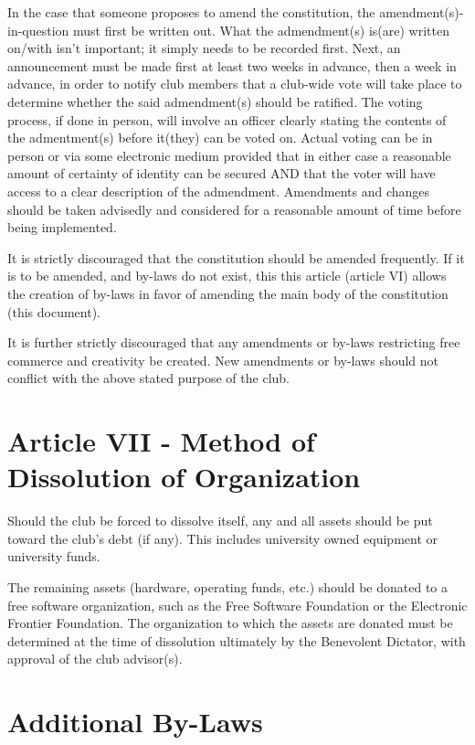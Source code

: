 \documentclass{article}
\begin{document}
	In the case that someone proposes to amend the constitution, the amendment(s)-in-question must first be written out.  What the admendment(s) is(are) written on/with isn't important; it simply needs to be recorded first.  Next, an announcement must be made first at least two weeks in advance, then a week in advance, in order to notify club members that a club-wide vote will take place to determine whether the said admendment(s) should be ratified. The voting process, if done in person, will involve an officer clearly stating the contents of the admentment(s) before it(they) can be voted on.  Actual voting can be in person or via some electronic medium provided that in either case a reasonable amount of certainty of identity can be secured AND that the voter will have access to a clear description of the admendment.  Amendments and changes should be taken advisedly and considered for a reasonable amount of time before being implemented.

	It is strictly discouraged that the constitution should be amended frequently. If it is to be amended, and by-laws do not exist, this this article (article VI) allows the creation of by-laws in favor of amending the main body of the constitution (this document).

	It is further strictly discouraged that any amendments or by-laws restricting free commerce and creativity be created. New amendments or by-laws should not conflict with the above stated purpose of the club.

	\section{Article VII - Method of Dissolution of Organization}

	Should the club be forced to dissolve itself, any and all assets should be put toward the club's debt (if any). This includes university owned equipment or university funds.

	The remaining assets (hardware, operating funds, etc.) should be donated to a free software organization, such as the Free Software Foundation or the Electronic Frontier Foundation.  The organization to which the assets are donated must be determined at the time of dissolution ultimately by the Benevolent Dictator, with approval of the club advisor(s).\pagebreak

	\section{Additional By-Laws}
\end{document}
